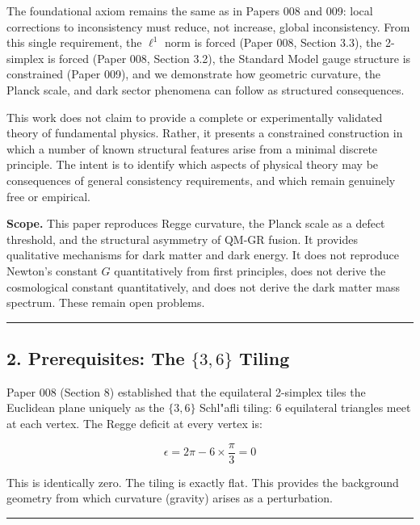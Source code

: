 \documentclass[
]{article}
\begin{document}
The foundational axiom remains the same as in Papers 008 and 009: local
corrections to inconsistency must reduce, not increase, global
inconsistency. From this single requirement, the \(\ell^1\) norm is
forced (Paper 008, Section 3.3), the 2-simplex is forced (Paper 008,
Section 3.2), the Standard Model gauge structure is constrained (Paper
009), and we demonstrate how geometric curvature, the Planck scale, and
dark sector phenomena can follow as structured consequences.

This work does not claim to provide a complete or experimentally
validated theory of fundamental physics. Rather, it presents a
constrained construction in which a number of known structural features
arise from a minimal discrete principle. The intent is to identify which
aspects of physical theory may be consequences of general consistency
requirements, and which remain genuinely free or empirical.

\textbf{Scope.} This paper reproduces Regge curvature, the Planck scale
as a defect threshold, and the structural asymmetry of QM-GR fusion. It
provides qualitative mechanisms for dark matter and dark energy. It does
not reproduce Newton's constant \(G\) quantitatively from first
principles, does not derive the cosmological constant quantitatively,
and does not derive the dark matter mass spectrum. These remain open
problems.

\begin{center}\rule{0.5\linewidth}{0.5pt}\end{center}

\hypertarget{prerequisites-the-36-tiling}{%
\subsection{\texorpdfstring{2. Prerequisites: The \(\{3,6\}\)
Tiling}{2. Prerequisites: The \textbackslash\{3,6\textbackslash\} Tiling}}\label{prerequisites-the-36-tiling}}

Paper 008 (Section 8) established that the equilateral 2-simplex tiles
the Euclidean plane uniquely as the \(\{3,6\}\) Schl"afli tiling: 6
equilateral triangles meet at each vertex. The Regge deficit at every
vertex is:

\[\epsilon = 2\pi - 6 \times \frac{\pi}{3} = 0\]

This is identically zero. The tiling is exactly flat. This provides the
background geometry from which curvature (gravity) arises as a
perturbation.

\begin{center}\rule{0.5\linewidth}{0.5pt}\end{center}
\end{document}
